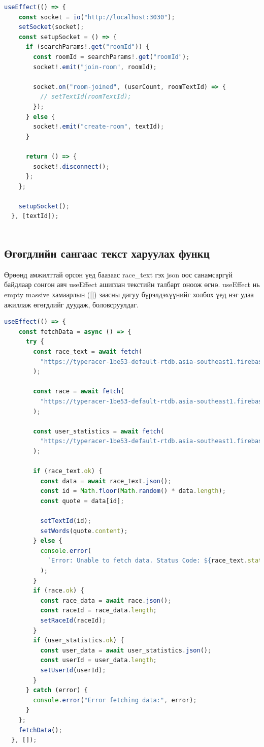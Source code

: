 \begin{lstlisting}[language=Javascript, caption=Хэрэглэгч өрөөнд нэвтрэх client талын код, frame=single]
	useEffect(() => {
    const socket = io("http://localhost:3030");
    setSocket(socket);
    const setupSocket = () => {
      if (searchParams!.get("roomId")) {
        const roomId = searchParams!.get("roomId");
        socket!.emit("join-room", roomId);

        socket.on("room-joined", (userCount, roomTextId) => {
          // setTextId(roomTextId);
        });
      } else {
        socket!.emit("create-room", textId);
      }

      return () => {
        socket!.disconnect();
      };
    };

    setupSocket();
  }, [textId]);
			
\end{lstlisting}


\subsection{Өгөгдлийн сангаас текст харуулах функц}

Өрөөнд амжилттай орсон үед баазаас race\_text гэх json оос санамсаргүй байдлаар сонгон авч useEffect ашиглан текстийн талбарт оноож өгнө.
useEffect нь empty massive хамаарлын ([]) заасны дагуу бүрэлдэхүүнийг холбох үед нэг удаа ажиллаж өгөгдлийг дуудаж, боловсруулдаг.

\begin{lstlisting}[language=Javascript, caption=Текст fetch хийж буй async функц, frame=single]
	useEffect(() => {
    const fetchData = async () => {
      try {
        const race_text = await fetch(
          "https://typeracer-1be53-default-rtdb.asia-southeast1.firebasedatabase.app/race_text.json"
        );

        const race = await fetch(
          "https://typeracer-1be53-default-rtdb.asia-southeast1.firebasedatabase.app/race.json"
        );

        const user_statistics = await fetch(
          "https://typeracer-1be53-default-rtdb.asia-southeast1.firebasedatabase.app/user_statistics.json"
        );

        if (race_text.ok) {
          const data = await race_text.json();
          const id = Math.floor(Math.random() * data.length);
          const quote = data[id];

          setTextId(id);
          setWords(quote.content);
        } else {
          console.error(
            `Error: Unable to fetch data. Status Code: ${race_text.status}`
          );
        }
        if (race.ok) {
          const race_data = await race.json();
          const raceId = race_data.length;
          setRaceId(raceId);
        }
        if (user_statistics.ok) {
          const user_data = await user_statistics.json();
          const userId = user_data.length;
          setUserId(userId);
        }
      } catch (error) {
        console.error("Error fetching data:", error);
      }
    };
    fetchData();
  }, []);
			
\end{lstlisting}

